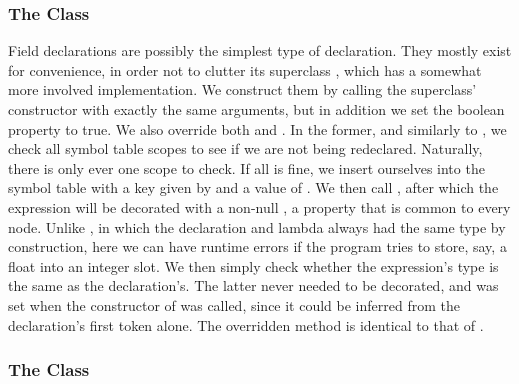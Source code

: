 \subsubsection{The  Class}

Field declarations are possibly the simplest type of declaration. They mostly exist for convenience, in order not to clutter its superclass , which has a somewhat more involved implementation. We construct them by calling the superclass' constructor with exactly the same arguments, but in addition we set the  boolean property to true. We also override both  and . In the former, and similarly to , we check all symbol table scopes to see if we are not being redeclared. Naturally, there is only ever one scope to check. If all is fine, we insert ourselves into the symbol table with a key given by  and a value of . We then call , after which the expression will be decorated with a non-null , a property that is common to every node. Unlike , in which the declaration and lambda always had the same type by construction, here we can have runtime errors if the program tries to store, say, a float into an integer slot. We then simply check whether the expression's type is the same as the declaration's. The latter never needed to be decorated, and was set when the constructor of  was called, since it could be inferred from the declaration's first token alone. The overridden  method is identical to that of .

\subsubsection{The  Class}

